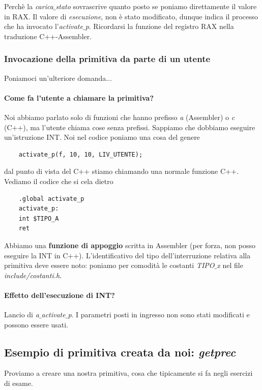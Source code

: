 \begin{itemize}
\begin{framed}
		Perchè la \emph{carica$\_$stato} sovrascrive quanto posto se poniamo direttamente il valore in RAX. Il valore di \emph{esecuzione}, non è stato modificato, dunque indica il processo che ha invocato l'\emph{activate$\_$p}. Ricordarsi la funzione del registro RAX nella traduzione C++-Assembler.
	\end{framed}
\end{itemize}

\subsubsection{Invocazione della primitiva da parte di un utente}
Poniamoci un'ulteriore domanda...
\paragraph{Come fa l'utente a chiamare la primitiva?} Noi abbiamo parlato solo di funzioni che hanno prefisso \emph{a} (Assembler) o \emph{c} (C++), ma l'utente chiama cose senza prefissi. Sappiamo che dobbiamo eseguire un'istruzione INT. Noi nel codice poniamo una cosa del genere
\begin{verbatim}
	activate_p(f, 10, 10, LIV_UTENTE);
\end{verbatim}
dal punto di vista del C++ stiamo chiamando una normale funzione C++. Vediamo il codice che si cela dietro
\small 
\begin{verbatim}
	.global activate_p
	activate_p:
	int $TIPO_A
	ret
\end{verbatim}
\normalsize 
Abbiamo una \textbf{funzione di appoggio} scritta in Assembler (per forza, non posso eseguire la INT in C++). L'identificativo del tipo dell'interruzione relativa alla primitiva deve essere noto: poniamo per comodità le costanti \emph{TIPO$\_$x} nel file \emph{include/costanti.h}.

\paragraph{Effetto dell'esecuzione di INT?} Lancio di \emph{a$\_$activate$\_$p}. I parametri posti in ingresso non sono stati modificati e possono essere usati.

\subsection{Esempio di primitiva creata da noi: \emph{getprec}}
Proviamo a creare una nostra primitiva, cosa che tipicamente si fa negli esercizi di esame.

